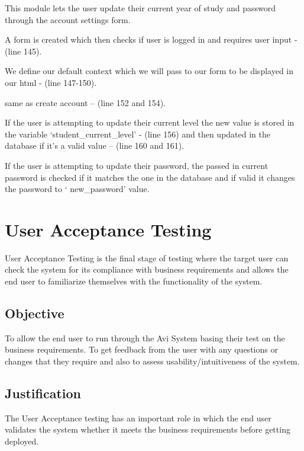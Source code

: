 \documentclass[10pt]{article}
\begin{document}
\begin{description}[font=$\bullet$~\normalfont\scshape\color{red!50!black}]
\item [] This module lets the user update their current year of study and password through the account settings form.
\item [] A form is created which then checks if user is logged in and requires user input - (line 145).
\item [] We define our default context which we will pass to our form to be displayed in our html - (line 147-150).
\item [] same as create account – (line 152 and 154).
\item [] If the user is attempting to update their current level the new value is stored in the variable ‘student\_current\_level’ - (line 156) and then updated in the database if it’s a valid value – (line 160 and 161). 
\item [] If the user is attempting to update their password, the passed in current password is checked if it matches the one in the database and if valid it changes the password to ‘ new\_password’ value.

\end{description}

\section{User Acceptance Testing}

User Acceptance Testing is the final stage of testing where the target user can check the system for its compliance with business requirements and allows the end user to familiarize themselves with the functionality of the system.

\subsection{Objective}
To allow the end user to run through the Avi System basing their test on the business requirements. To get feedback from the user with any questions or changes that they require and also to assess usability/intuitiveness of the system.

\subsection{Justification}
The User Acceptance testing has an important role in which the end user validates the system whether it meets the business requirements before getting deployed. 
\end{document}
